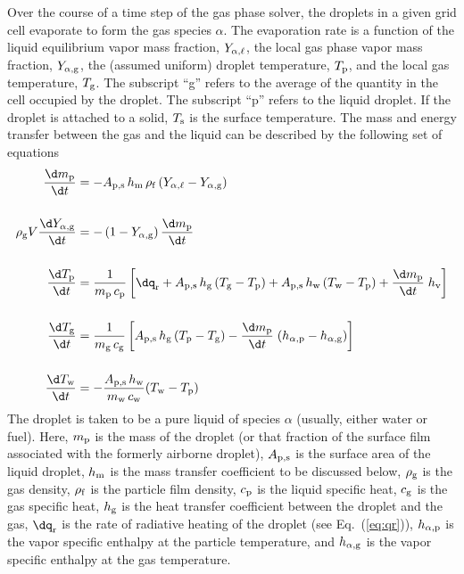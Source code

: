 Over the course of a time step of the gas phase solver, the droplets in a given grid cell evaporate to form the gas species $\alpha$. The evaporation rate is a function of the liquid equilibrium vapor mass fraction, $Y_{\rm \alpha,\ell}$, the local gas phase vapor mass fraction, $Y_{\rm \alpha,g}$, the (assumed uniform) droplet temperature, $T_{\rm p}$, and the local gas temperature, $T_{\rm g}$. The subscript ``g'' refers to the average of the quantity in the cell occupied by the droplet. The subscript ``p'' refers to the liquid droplet. If the droplet is attached to a solid, $T_{\rm s}$ is the surface temperature. The mass and energy transfer between the gas and the liquid can be described by the following set of equations~\cite{Cheremisinoff:1}
\begin{align}
\frac{\d m_{\rm p}}{\d t} & = - A_{\rm p,s} \, h_{\rm m} \, \rho_{\rm f} \, (Y_{\alpha,\ell} - Y_{\rm \alpha, g}) \label{droplet_mass} \\[0.2in]
\rho_{\rm g} V \frac{\d Y_{\rm \alpha, g}}{\d t} & = -\left(1-Y_{\rm \alpha, g}\right)\frac{\d m_{\rm p}}{\d t}  \label{droplet_gas_fraction} \\[0.2in]
\frac{\d T_{\rm p}}{\d t} & = \frac{1}{m_{\rm p} \, c_{\rm p}}  \left[ \dq_{\rm r} + A_{\rm p,s} \, h_{\rm g}  \, (T_{\rm g}-T_{\rm p}) + A_{\rm p,s} \, h_{\rm w}  \, (T_{\rm w}-T_{\rm p}) + \frac{\d m_{\rm p}}{\d t} \; h_{\rm v} \right]  \label{droplet_temp}  \\[0.2in]
\frac{\d T_{\rm g}}{\d t} & = \frac{1}{m_{\rm g} \, c_{\rm g}}  \left[A_{\rm p,s} \, h_{\rm g}  \, (T_{\rm p}-T_{\rm g}) - \frac{\d m_{\rm p}}{\d t} \; (h_{\rm \alpha,p}-h_{\rm \alpha,g}) \right]  \label{droplet_gas_temp}   \\[0.2in]
\frac{\d T_{\rm w}}{\d t} & = -\frac{A_{\rm p,s} \, h_{\rm w}}{m_{\rm w} \, c_{\rm w}} (T_{\rm w}-T_{\rm p})  \label{droplet_solid_temp}
\end{align}
The droplet is taken to be a pure liquid of species $\alpha$ (usually, either water or fuel).  Here, $m_{\rm p}$ is the mass of the droplet (or that fraction of the surface film associated with the formerly airborne droplet), $A_{\rm p,s}$ is the surface area of the liquid droplet, $h_{\rm m}$ is the mass transfer coefficient to be discussed below, $\rho_{\rm g}$ is the gas density, $\rho_{\rm f}$ is the particle film density, $c_{\rm p}$ is the liquid specific heat, $c_{\rm g}$ is the gas specific heat, $h_{\rm g}$ is the heat transfer coefficient between the droplet and the gas, $\dq_{\rm r}$ is the rate of radiative heating of the droplet (see Eq.~(\ref{eq:qr})), $h_{\rm \alpha,p}$ is the vapor specific enthalpy at the particle temperature, and $h_{\rm \alpha,g}$ is the vapor specific enthalpy at the gas temperature.

